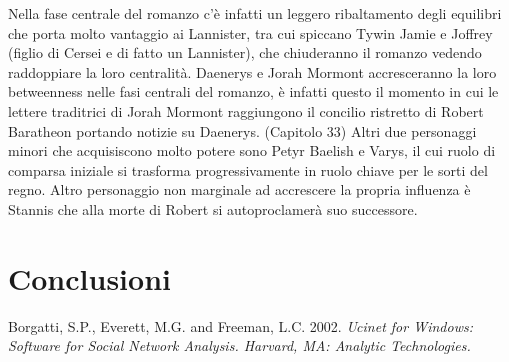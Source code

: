 \documentclass[a4paper]{article}
\begin{document}
Nella fase centrale del romanzo c'è infatti un leggero ribaltamento degli equilibri che porta molto vantaggio ai Lannister, tra cui spiccano Tywin Jamie e Joffrey (figlio di Cersei e di fatto un Lannister), che chiuderanno il romanzo vedendo raddoppiare la loro centralità.
Daenerys e Jorah Mormont accresceranno la loro betweenness nelle fasi centrali del romanzo, è infatti questo il momento in cui le lettere traditrici di Jorah Mormont raggiungono il concilio ristretto di Robert Baratheon portando notizie su Daenerys. (Capitolo 33)
Altri due personaggi minori che acquisiscono molto potere sono Petyr Baelish e Varys, il cui ruolo di comparsa iniziale si trasforma progressivamente in ruolo chiave per le sorti del regno.
Altro personaggio non marginale ad accrescere la propria influenza è Stannis che alla morte di Robert si autoproclamerà suo successore.



\section{Conclusioni}


\begin{thebibliography}{9}
  	Borgatti, S.P., Everett, M.G. and Freeman, L.C. 2002. 		\emph{Ucinet for Windows: Software for Social Network Analysis. Harvard, MA: Analytic Technologies.} 
\end{thebibliography}
\end{document}
